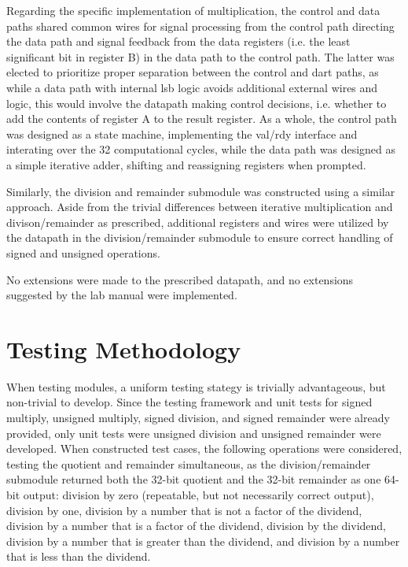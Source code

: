 \documentclass[12pt]{article}
\begin{document}
Regarding the specific implementation of multiplication, the control and data
paths shared common wires for signal processing from the control path directing
the data path and signal feedback from the data registers (i.e. the least
significant bit in register B) in the data path to the control path. The latter
was elected to prioritize proper separation between the control and dart paths,
as while a data path with internal lsb logic avoids additional external wires
and logic, this would involve the datapath making control decisions, i.e. whether to add the contents of register A to the result register.
As a whole, the control path was designed as a state machine, implementing the val/rdy interface and interating over the 32 computational cycles, while the data path was designed as a simple iterative adder, shifting and reassigning registers when prompted.

Similarly, the division and remainder submodule was constructed using a similar approach. Aside from the trivial differences between iterative multiplication and divison/remainder as prescribed, additional registers and wires were utilized by the datapath in the division/remainder submodule to ensure correct handling of signed and unsigned operations. 


No extensions were made to the prescribed datapath, and no extensions suggested by the lab manual were implemented. 



\section*{Testing Methodology}

When testing modules, a uniform testing stategy is trivially advantageous, but non-trivial to develop. Since the testing framework and unit tests for signed multiply, unsigned multiply, signed division, and signed remainder were already provided, only unit tests were unsigned division and unsigned remainder were developed. 
When constructed test cases, the following operations were considered, testing the quotient and remainder simultaneous, as the division/remainder submodule returned both the 32-bit quotient and the 32-bit remainder as one 64-bit output:
division by zero (repeatable, but not necessarily correct output), division by one, division by a number that is not a factor of the dividend, division by a number that is a factor of the dividend, division by the dividend, division by a number that is greater than the dividend, and division by a number that is less than the dividend.
\end{document}
